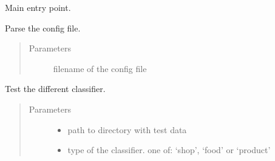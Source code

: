 \documentclass[letterpaper,10pt,english]{sphinxmanual}
\begin{document}

\begin{fulllineitems}
\label{\detokenize{api:backend.main}}
Main entry point.

\end{fulllineitems}


\begin{fulllineitems}
\label{\detokenize{api:backend.read_config}}
Parse the config file.
\begin{quote}\begin{description}
\item[{Parameters}] \leavevmode
{} \textendash{} filename of the config file

\end{description}\end{quote}

\end{fulllineitems}


\begin{fulllineitems}
\label{\detokenize{api:backend.test_clf}}
Test the different classifier.
\begin{quote}\begin{description}
\item[{Parameters}] \leavevmode\begin{itemize}
\item {} 
 \textendash{} path to directory with test data

\item {} 
 \textendash{} type of the classifier. one of: ‘shop’, ‘food’ or ‘product’

\end{itemize}

\end{description}\end{quote}

\end{fulllineitems}
\end{document}
